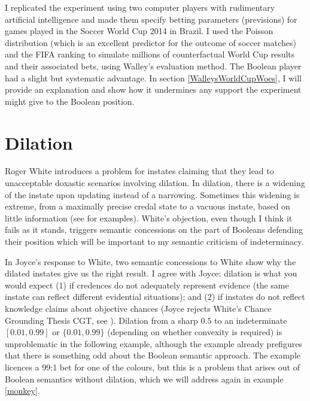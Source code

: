 \documentclass[11pt]{article}
\begin{document}
I replicated the experiment using two computer players with
rudimentary artificial intelligence and made them specify betting
parameters (previsions) for games played in the Soccer World Cup 2014
in Brazil. I used the Poisson distribution (which is an excellent
predictor for the outcome of soccer matches) and the FIFA ranking to
simulate millions of counterfactual World Cup results and their
associated bets, using Walley's evaluation method. The Boolean player
had a slight but systematic advantage. In section
\ref{WalleysWorldCupWoes}, I will provide an explanation and show how
it undermines any support the experiment might give to the Boolean
position.

\section{Dilation}
\label{Dilation}

Roger White introduces a problem for instates claiming that they lead
to unacceptable doxastic scenarios involving dilation. In dilation,
there is a widening of the instate upon updating instead of a
narrowing. Sometimes this widening is extreme, from a maximally
precise credal state to a vacuous instate, based on little information
(see  for examples). White's objection, even
though I think it fails as it stands, triggers semantic concessions on
the part of Booleans defending their position which will be important
to my semantic criticism of indeterminacy.

In Joyce's response to White, two semantic concessions to White show
why the dilated instates give us the right result. I agree with Joyce:
dilation is what you would expect (1) if credences do not adequately
represent evidence (the same instate can reflect different evidential
situations); and (2) if instates do not reflect knowledge claims about
objective chances (Joyce rejects White's Chance Grounding Thesis CGT,
see ). Dilation from a sharp $0.5$ to an
indeterminate $[0.01,0.99]$ or $\{0.01,0.99\}$ (depending on whether
convexity is required) is unproblematic in the following example,
although the example already prefigures that there is something odd
about the Boolean semantic approach. The example licences a 99:1 bet
for one of the colours, but this is a problem that arises out of
Boolean semantics without dilation, which we will address again in
example \ref{monkey}.

\addtocounter{expls}{1}

\end{document}
